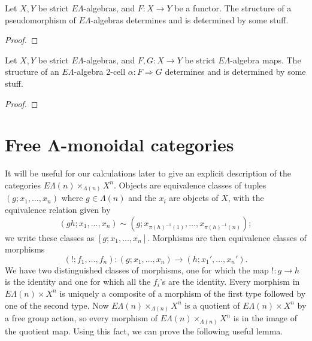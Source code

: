 \documentclass{amsbook} %
\newcommand{\ML}{\mathbf{\Lambda}}
\newcommand{\EL}{E\Lambda}
\numberwithin{section}{chapter}
\begin{document}
\begin{prop}\label{el_weakmap}
Let $X,Y$ be strict $\EL$-algebras, and $F:X \to Y$ be a functor. The structure of a pseudomorphism of $\EL$-algebras determines and is determined by some stuff.
\end{prop}
\begin{proof}

\end{proof}

\begin{prop}\label{el_2cells}
Let $X,Y$ be strict $\EL$-algebras, and $F, G:X \to Y$ be strict $\EL$-algebra maps. The structure of an $\EL$-algebra 2-cell $\alpha:F \Rightarrow G$ determines and is determined by some stuff.
\end{prop}
\begin{proof}

\end{proof}

\section{Free $\ML$-monoidal categories}


It will be useful for our calculations later to give an explicit description of the categories $E\Lambda(n) \times_{\Lambda(n)} X^{n}$.  Objects are equivalence classes of tuples $(g; x_1, \ldots, x_n)$ where $g \in \Lambda(n)$ and the $x_{i}$ are objects of $X$, with the equivalence relation given by
\[
(gh; x_1, \ldots, x_n) \sim (g; x_{\pi(h)^{-1}(1)}, \ldots, x_{\pi(h)^{-1}(n)});
\]
we write these classes as $[g; x_1, \ldots, x_n]$.  Morphisms are then equivalence classes of morphisms
\[
(!; f_1, \ldots, f_n): (g; x_1, \ldots, x_n) \to (h; x_1', \ldots, x_n').
\]
We have two distinguished classes of morphisms, one for which the map $!: g \to h$ is the identity and one for which all the $f_{i}$'s are the identity.  Every morphism in $E\Lambda(n) \times X^{n}$ is uniquely a composite of a  morphism of the first type followed by one of the second type.  Now $E\Lambda(n) \times_{\Lambda(n)} X^{n}$ is a quotient of $E\Lambda(n) \times X^{n}$ by a free group action, so every morphism of $E\Lambda(n) \times_{\Lambda(n)} X^{n}$ is in the image of the quotient map.  Using this fact, we can prove the following useful lemma.
\end{document}
